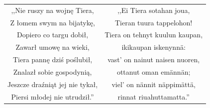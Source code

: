 \documentclass[11pt,a4paper,twoside]{report}
\begin{document}
{\centering
\small
\begin{longtable}{c c}
,,Nie ruszy na wojnę Tiera, & ,,Ei Tiera sotahan joua, \\
Z łomem swym na bijatykę, & Tieran tuura tappelohon! \\
Dopiero co targu dobił, & Tiera on tehnyt kuulun kaupan, \\
Zawarł umowę na wieki, & ikikaupan iskenynnä: \\
Tiera pannę dziś poślubił, & vast' on nainut naisen nuoren, \\
Znalazł sobie gospodynią, & ottanut oman emännän; \\
Jeszcze draźniąt jej nie tykał, & viel' on nännit näppimättä, \\
Piersi młodej nie utrudził.'' & rinnat riuahuttamatta.'' \\
\end{longtable}
}
\newpage
\end{document}
